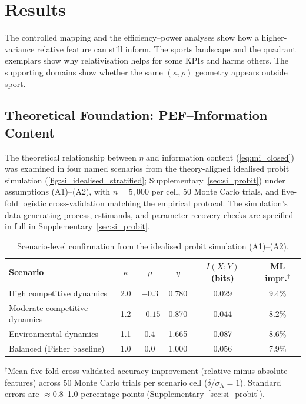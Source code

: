 \section{Results}
\label{sec:results}

The controlled mapping and the efficiency--power analyses show how a higher-variance relative feature can still inform. The sports landscape and the quadrant exemplars show why relativisation helps for some KPIs and harms others. The supporting domains show whether the same $(\kappa,\rho)$ geometry appears outside sport.

\subsection{Theoretical Foundation: PEF--Information Content}

The theoretical relationship between $\eta$ and information content (\cref{eq:mi_closed}) was examined in four named scenarios from the theory-aligned idealised probit simulation (\cref{fig:si_idealised_stratified}; Supplementary~\cref{sec:si_probit}) under assumptions (A1)--(A2), with $n=5{,}000$ per cell, 50 Monte Carlo trials, and five-fold logistic cross-validation matching the empirical protocol. The simulation's data-generating process, estimands, and parameter-recovery checks are specified in full in Supplementary~\cref{sec:si_probit}.

\begin{table}[t]
  \centering
  \caption{Scenario-level confirmation from the idealised probit simulation (A1)--(A2).}
  \label{tab:scenarios}
  \begin{tabular}{@{}lccccc@{}}
    \toprule
    \textbf{Scenario} & $\kappa$ & $\rho$ & $\eta$ & $I(X;Y)$ (bits) & ML impr.$^{\dagger}$ \\
    \midrule
    High competitive dynamics      & 2.0  & $-0.3$  & 0.780 & 0.029 & 9.4\% \\
    Moderate competitive dynamics  & 1.2  & $-0.15$ & 0.870 & 0.044 & 8.2\% \\
    Environmental dynamics         & 1.1  & 0.4     & 1.665 & 0.087 & 8.6\% \\
    Balanced (Fisher baseline)     & 1.0  & 0.0     & 1.000 & 0.056 & 7.9\% \\
    \bottomrule
  \end{tabular}

  \medskip
  \begin{minipage}{0.95\linewidth}\small
    $^{\dagger}$Mean five-fold cross-validated accuracy improvement (relative minus absolute features) across 50 Monte Carlo trials per scenario cell ($\delta/\sigma_{\mathrm{A}}=1$). Standard errors are $\approx$0.8--1.0 percentage points (Supplementary~\cref{sec:si_probit}).
  \end{minipage}
\end{table}

